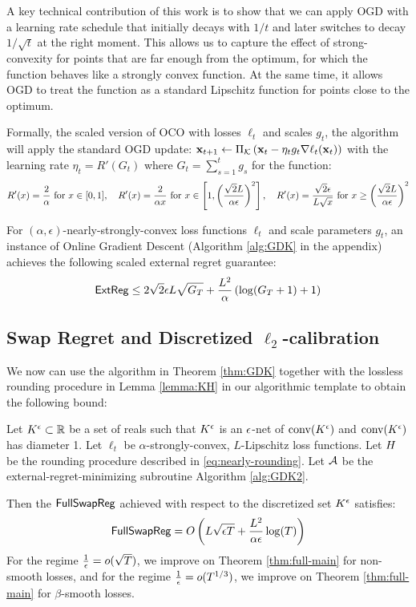 \documentclass[final,12pt]{alt2025}
\begin{document}
A key technical contribution of this work is to show that we can apply OGD with a learning rate schedule that initially decays with $1/t$ and later switches to decay $1/\sqrt{t}$ at the right moment. This allows us to capture the effect of strong-convexity for points that are far enough from the optimum, for which the function behaves like a strongly convex function. At the same time, it allows OGD to treat the function as a standard Lipschitz function for points close to the optimum.

Formally, the scaled version of OCO with losses $\ell_t$ and scales $g_t$, the algorithm will apply the standard OGD update: $\mathbf{x}_{t+1} \gets \Pi_{\mathcal{K}} \left(\mathbf{x}_t - \eta_t g_t \nabla \ell_t(\mathbf{x}_t)\right)$ with the learning rate $\eta_t = R'(G_t)$ where $G_t = \sum_{s=1}^{t} g_s$ for the function:
\begin{equation*}
    R'(x)  = \frac{2}{\alpha} \text{ for }x \in [0,1], \quad
R'(x) = \frac{2}{\alpha x} \text{ for }x \in \left[1,\left(\frac{\sqrt 2 L}{\alpha \epsilon}\right)^2\right], \quad
R'(x) = \frac{\sqrt2 \epsilon}{L\sqrt{x}} \text{ for } x \geq \left(\frac{\sqrt 2 L}{\alpha \epsilon}\right)^2
\end{equation*}


\begin{theorem}\label{thm:GDK}
    For $(\alpha,\epsilon)$-nearly-strongly-convex loss functions $\ell_t$ and scale parameters $g_t$, an instance of Online Gradient Descent (Algorithm \ref{alg:GDK} in the appendix) achieves the following scaled external regret guarantee:
\begin{align*}
    \mathsf{ExtReg} \leq 2\sqrt{2}\epsilon L\sqrt{G_T} + \frac{L^2}{\alpha}\left(\log(G_T+1)+1\right)
\end{align*}
\end{theorem}


\subsection{Swap Regret and Discretized $\ell_2$-calibration}

We now can use the algorithm in Theorem \ref{thm:GDK} together with the lossless rounding procedure in Lemma \ref{lemma:KH} in our algorithmic template to obtain the following bound:

\begin{theorem}\label{thm:disc-main}
    Let $K^{\epsilon} \subset \mathbb{R}$ be a set of reals such that $K^{\epsilon}$ is an $\epsilon$-net of $\mathrm{conv}(K^{\epsilon})$ and $\mathrm{conv}(K^{\epsilon})$ has diameter 1.  Let $\ell_t$ be $\alpha$-strongly-convex, $L$-Lipschitz loss functions.  Let $H$ be the rounding procedure described in \eqref{eq:nearly-rounding}. Let $\mathcal{A}$ be the external-regret-minimizing subroutine Algorithm \ref{alg:GDK2}.

    Then the $\mathsf{FullSwapReg}$ achieved with respect to the discretized set $K^{\epsilon}$ satisfies:
    \begin{equation*}
        \mathsf{FullSwapReg} = O\left(L\sqrt{\epsilon T}+\frac{L^2}{\alpha \epsilon}\log(T)\right)
    \end{equation*}
    For the regime $\frac{1}{\epsilon} = o(\sqrt{T})$, we improve on Theorem \ref{thm:full-main} for non-smooth losses, and for the regime $\frac{1}{\epsilon} = o(T^{1/3})$, we improve on Theorem \ref{thm:full-main} for $\beta$-smooth losses. 
\end{theorem}
\end{document}
